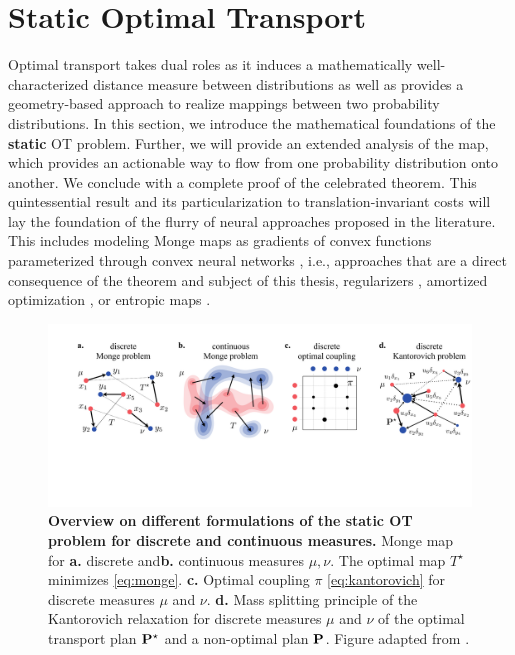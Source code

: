 \section{Static Optimal Transport} \label{sec:background_ot_static}

Optimal transport takes dual roles as it induces a mathematically well-characterized distance measure between distributions as well as provides a geometry-based approach to realize mappings between two probability distributions.
In this section, we introduce the mathematical foundations of the \textbf{static} OT problem. Further, we will provide an extended analysis of the \citeauthor{monge1781histoire} map, which provides an actionable way to flow from one probability distribution onto another.
We conclude with a complete proof of the celebrated \citeauthor{brenier1987decomposition} theorem. This quintessential result and its particularization to translation-invariant costs will lay the foundation of the flurry of neural approaches proposed in the literature. This includes modeling Monge maps as gradients of convex functions parameterized through convex neural networks \citep{amos2017input, huang2021convex, makkuva2020optimal, korotin2021neural, lubeck2022neural, bunne2022supervised}, i.e., approaches that are a direct consequence of the \citeauthor{brenier1987decomposition} theorem and subject of this thesis, regularizers \citep{uscidda2023monge}, amortized optimization \citep{amos2022amortizing, amos2022meta}, or entropic maps \citep{pooladian2021entropic, pooladian2023minimax, divol2022optimal, cuturi2023monge}.

\begin{figure}[t]
  \includegraphics[width=\textwidth]{figures/fig_ot_background.pdf}
  \caption{\textbf{Overview on different formulations of the static OT problem for discrete and continuous measures.} Monge map for \textbf{a.} discrete and\textbf{b.} continuous measures $\mu, \nu$. The optimal map $T^\star$ minimizes \eqref{eq:monge}. \textbf{c.} Optimal coupling $\pi$ \eqref{eq:kantorovich} for discrete measures $\mu$ and $\nu$. \textbf{d.} Mass splitting principle of the Kantorovich relaxation for discrete measures $\mu$ and $\nu$ of the optimal transport plan $\mathbf{P}^\star$ and a non-optimal plan $\mathbf{P}$. Figure adapted from \citet{peyre2019computational}.}	
  \label{fig:ot_principles}
\end{figure}

